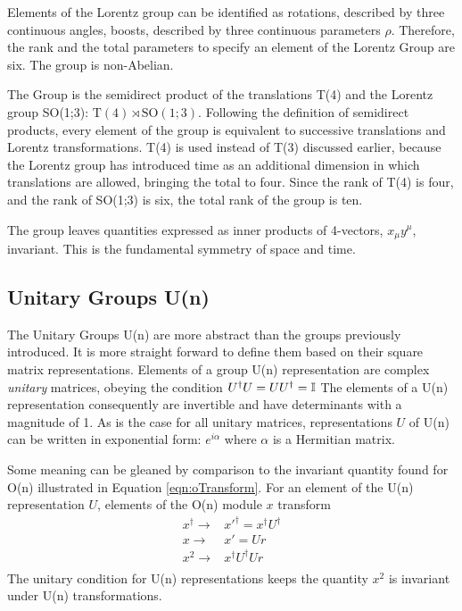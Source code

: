 Elements of the Lorentz group can be identified as rotations, described by three continuous angles, boosts, described by three continuous parameters $\rho$.
Therefore, the rank and the total parameters to specify an element of the Lorentz Group are six.
The group is non-Abelian.

The \poincare Group is the semidirect product of the translations T(4) and the Lorentz group SO(1;3): $\text{T}(4)\rtimes\text{SO}(1;3)$.
Following the definition of semidirect products, every element of the \poincare group is equivalent to successive translations and Lorentz transformations.
T(4) is used instead of T(3) discussed earlier, because the Lorentz group has introduced time as an additional dimension in which translations are allowed, bringing the total to four.
Since the rank of T(4) is four, and the rank of SO(1;3) is six, the total rank of the \poincare group is ten.


The \poincare group leaves quantities expressed as inner products of 4-vectors, $x_\mu y^\mu$, invariant.
This is the fundamental symmetry of space and time. 

\subsection{Unitary Groups U(n)}\label{sec:unitary}

The Unitary Groups U(n) are more abstract than the groups previously introduced.
It is more straight forward to define them based on their \nxn square matrix representations.
Elements of a group U(n) representation are complex \emph{unitary} matrices, obeying the condition $U^\dagger U=UU^\dagger=\mathbb{I}$
The elements of a U(n) representation consequently are invertible and have determinants with a magnitude of 1.
As is the case for all unitary matrices, representations $U$ of U(n) can be written in exponential form: $e^{i\alpha}$ where $\alpha$ is a Hermitian matrix.

Some meaning can be gleaned by comparison to the invariant quantity found for O(n) illustrated in Equation \ref{eqn:oTransform}.
For an element of the U(n) representation $U$, elements of the O(n) module $x$ transform 
\begin{equation}\begin{split}\label{eqn:uTransform}
    x^\dagger\to&x'^\dagger=x^\dagger U^\dagger \\
    x\to&x'=Ur \\
    x^2\to&x^\dagger U^\dagger Ur \\
\end{split}\end{equation}
The unitary condition for U(n) representations keeps the quantity $x^2$ is invariant under U(n) transformations.

